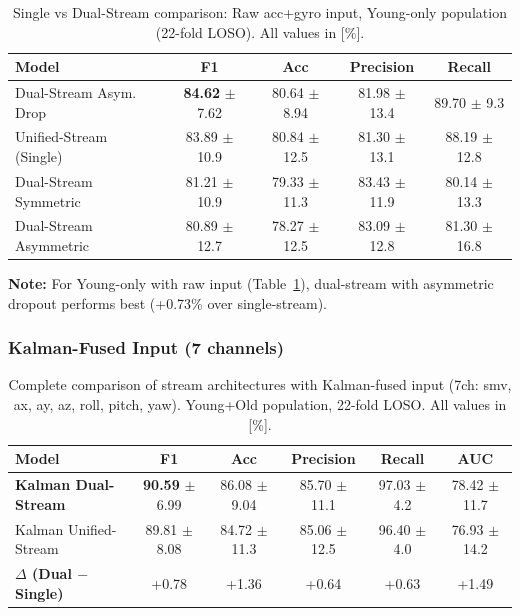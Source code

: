 \documentclass{article}
\begin{document}
\begin{table}[htbp]
    \centering
    \caption{Single vs Dual-Stream comparison: Raw acc+gyro input, Young-only population (22-fold LOSO). All values in [\%].}
    \label{tab:rq1_raw_young}
    \begin{tabular}{lcccc}
        \toprule
        \textbf{Model} & \textbf{F1} & \textbf{Acc} & \textbf{Precision} & \textbf{Recall} \\
        \midrule
        Dual-Stream Asym. Drop & \textbf{84.62} $\pm$ 7.62 & 80.64 $\pm$ 8.94 & 81.98 $\pm$ 13.4 & 89.70 $\pm$ 9.3 \\
        Unified-Stream (Single) & 83.89 $\pm$ 10.9 & 80.84 $\pm$ 12.5 & 81.30 $\pm$ 13.1 & 88.19 $\pm$ 12.8 \\
        Dual-Stream Symmetric & 81.21 $\pm$ 10.9 & 79.33 $\pm$ 11.3 & 83.43 $\pm$ 11.9 & 80.14 $\pm$ 13.3 \\
        Dual-Stream Asymmetric & 80.89 $\pm$ 12.7 & 78.27 $\pm$ 12.5 & 83.09 $\pm$ 12.8 & 81.30 $\pm$ 16.8 \\
        \bottomrule
    \end{tabular}
\end{table}

\textbf{Note:} For Young-only with raw input (Table~\ref{tab:rq1_raw_young}), dual-stream with asymmetric dropout performs best (+0.73\% over single-stream).

\subsubsection{Kalman-Fused Input (7 channels)}

\begin{table}[htbp]
    \centering
    \caption{Complete comparison of stream architectures with Kalman-fused input (7ch: smv, ax, ay, az, roll, pitch, yaw). Young+Old population, 22-fold LOSO. All values in [\%].}
    \label{tab:rq1_kalman_yo}
    \begin{tabular}{lccccc}
        \toprule
        \textbf{Model} & \textbf{F1} & \textbf{Acc} & \textbf{Precision} & \textbf{Recall} & \textbf{AUC} \\
        \midrule
        \textbf{Kalman Dual-Stream} & \textbf{90.59} $\pm$ 6.99 & 86.08 $\pm$ 9.04 & 85.70 $\pm$ 11.1 & 97.03 $\pm$ 4.2 & 78.42 $\pm$ 11.7 \\
        Kalman Unified-Stream & 89.81 $\pm$ 8.08 & 84.72 $\pm$ 11.3 & 85.06 $\pm$ 12.5 & 96.40 $\pm$ 4.0 & 76.93 $\pm$ 14.2 \\
        \midrule
        \textbf{$\Delta$ (Dual $-$ Single)} & +0.78 & +1.36 & +0.64 & +0.63 & +1.49 \\
        \bottomrule
    \end{tabular}
\end{table}
\end{document}

